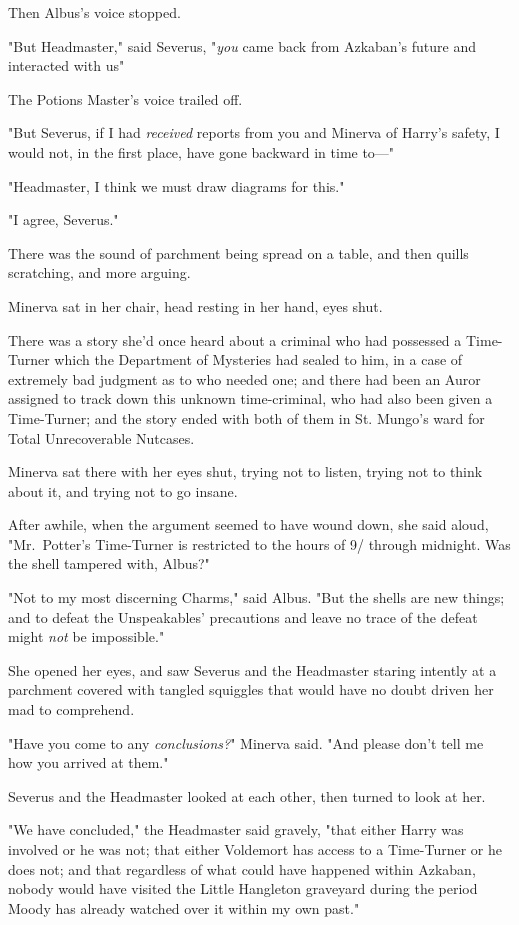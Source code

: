 Then Albus's voice stopped.

"But Headmaster," said Severus, "\emph{you} came back from Azkaban's future and
interacted with us{\el}"

The Potions Master's voice trailed off.

"But Severus, if I had \emph{received} reports from you and Minerva of Harry's
safety, I would not, in the first place, have gone backward in time to---"

"Headmaster, I think we must draw diagrams for this."

"I agree, Severus."

There was the sound of parchment being spread on a table, and then quills
scratching, and more arguing.

Minerva sat in her chair, head resting in her hand, eyes shut.

There was a story she'd once heard about a criminal who had possessed a
Time-Turner which the Department of Mysteries had sealed to him, in a case of
extremely bad judgment as to who needed one; and there had been an Auror
assigned to track down this unknown time-criminal, who had also been given a
Time-Turner; and the story ended with both of them in St. Mungo's ward for
Total Unrecoverable Nutcases.

Minerva sat there with her eyes shut, trying not to listen, trying not to think
about it, and trying not to go insane.

After awhile, when the argument seemed to have wound down, she said aloud,
"Mr.~Potter's Time-Turner is restricted to the hours of 9\PM/ through
midnight. Was the shell tampered with, Albus?"

"Not to my most discerning Charms," said Albus. "But the shells are new things;
and to defeat the Unspeakables' precautions and leave no trace of the
defeat{\el} might \emph{not} be impossible."

She opened her eyes, and saw Severus and the Headmaster staring intently at a
parchment covered with tangled squiggles that would have no doubt driven her
mad to comprehend.

"Have you come to any \emph{conclusions?}" Minerva said. "And please don't tell
me how you arrived at them."

Severus and the Headmaster looked at each other, then turned to look at her.

"We have concluded," the Headmaster said gravely, "that either Harry was
involved or he was not; that either Voldemort has access to a Time-Turner or he
does not; and that regardless of what could have happened within Azkaban,
nobody would have visited the Little Hangleton graveyard during the period
Moody has already watched over it within my own past."

